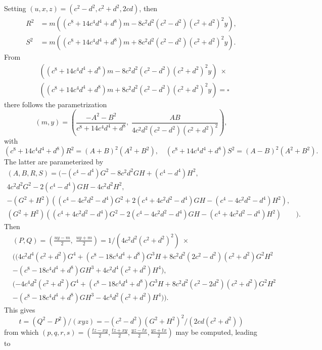 \documentclass[10pt]{amsart}
\theoremstyle{plain}
\begin{document}
Setting $(u,x,z)=(c^2-d^2,c^2+d^2,2c d)$, then
\begin{align*}
R^2 & = m( (c^8+14c^4d^4+d^8)m - 8c^2d^2(c^2-d^2)(c^2+d^2)^2y),\\
S^2 & = m( (c^8+14c^4d^4+d^8)m + 8c^2d^2(c^2-d^2)(c^2+d^2)^2y).
\end{align*}
From
\begin{align*}
& ( (c^8+14c^4d^4+d^8)m - 8c^2d^2(c^2-d^2)(c^2+d^2)^2y) \; \times \\
& ( (c^8+14c^4d^4+d^8)m + 8c^2d^2(c^2-d^2)(c^2+d^2)^2y)=\square
\end{align*}
there follows the parametrization 
\[ (m,y) = ( \frac{-A^2-B^2}{c^8+14c^4d^4+d^8}, \; \frac{A B}{4c^2d^2(c^2-d^2)
(c^2+d^2)^2} ), \]
with 
\[ (c^8+14c^4d^4+d^8) R^2 = (A+B)^2 (A^2+B^2), \quad (c^8+14c^4d^4+d^8)S^2 = (A-
B)^2 (A^2+B^2). \]
The latter are parameterized by
\begin{align*}
	(A,B,R,S) = ( -(c^4-d^4) G^2 - 8c^2d^2 G H + (c^4-d^4) H^2, & \\
    4 c^2d^2 G^2 - 2(c^4-d^4) G H - 4c^2d^2 H^2, & \\
	-(G^2 + H^2)((c^4-4c^2d^2-d^4)G^2 + 2(c^4+4c^2d^2-d^4) G H  - (c^4-4c^2d
^2-d^4) H^2), & \\
	(G^2 + H^2)((c^4+4c^2d^2-d^4)G^2 - 2(c^4-4c^2d^2-d^4) G H - (c^4+4c^2d^2
-d^4) H^2) & ).
\end{align*}
Then
\begin{align*}
	& (P,Q) = (\frac{u y-m}{2}, \; \frac{u y+m}{2}) = 1/(4c^2d^2(c^2+d^2)^2)
 \; \times \\
	& ( (4c^2d^4(c^2+d^2)G^4 + (c^8-18c^4d^4+d^8) G^3 H + 8c^2d^2(2c^2-d^2)(
c^2+d^2) G^2 H^2 \\
	& - (c^8-18 c^4d^4+d^8) G H^3 + 4c^2d^4(c^2+d^2) H^4), \\
	& (-4c^4d^2(c^2+d^2)G^4 + (c^8-18c^4d^4+d^8) G^3 H + 8c^2d^2(c^2-2d^2)(c
^2+d^2) G^2 H^2 \\
	& -(c^8-18c^4d^4+d^8) G H^3 -4 c^4d^2(c^2+d^2) H^4)).
\end{align*}
This gives
\[ t=(Q^2-P^2)/(x y z) = -(c^2-d^2)(G^2+H^2)^2/(2c d(c^2+d^2)) \]
from which $(p,q,r,s)=\left( \frac{t z-x y}{2}, \frac{t z+x y}{2}, \frac{y z-t x
}{2}, \frac{y z+t x}{2} \right)$
may be computed, leading to \\
\end{document}
